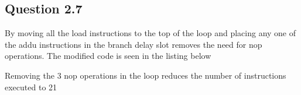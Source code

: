 \subsection{Question 2.7}
By moving all the load instructions to the top of the loop and placing any one of the addu instructions in the branch delay
slot removes the need for nop operations. The modified code is seen in the listing below

Removing the 3 nop operations in the loop reduces the number of instructions executed to 21
